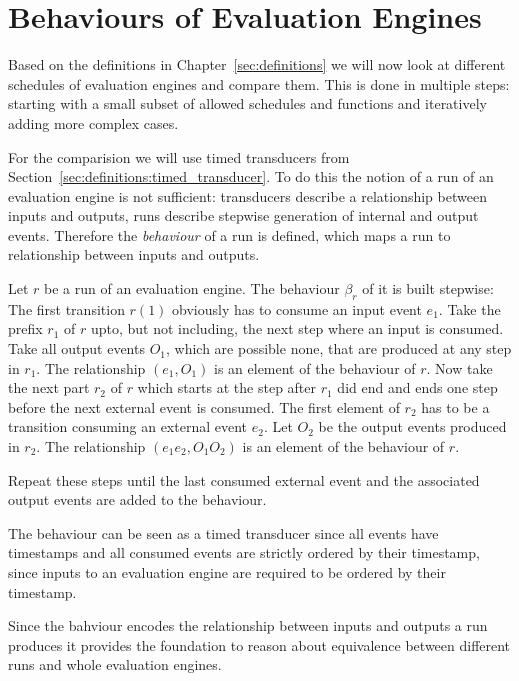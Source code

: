 \chapter{Behaviours of Evaluation Engines}
\label{sec:behaviours}

Based on the definitions in Chapter~\ref{sec:definitions} we will now look at different schedules of evaluation engines and compare them.
This is done in multiple steps: starting with a small subset of allowed schedules and functions and iteratively adding more complex cases.

For the comparision we will use timed transducers from Section~\ref{sec:definitions:timed_transducer}.
To do this the notion of a run of an evaluation engine is not sufficient: transducers describe a relationship between inputs and outputs, runs describe stepwise generation of internal and output events.
Therefore the \emph{behaviour} of a run is defined, which maps a run to relationship between inputs and outputs.

\begin{definition}[name = Behaviour of a Run]\label{def:behaviour_run}
  Let \(r\) be a run of an evaluation engine.
  The behaviour \(\beta_r\) of it is built stepwise:
  The first transition \(r(1)\) obviously has to consume an input event \(e_1\).
  Take the prefix \(r_1\) of \(r\) upto, but not including, the next step where an input is consumed.
  Take all output events \(O_1\), which are possible none, that are produced at any step in \(r_1\).
  The relationship \((e_1,O_1)\) is an element of the behaviour of \(r\).
  Now take the next part \(r_2\) of \(r\) which starts at the step after \(r_1\) did end and ends one step before the next external event is consumed.
  The first element of \(r_2\) has to be a transition consuming an external event \(e_2\).
  Let \(O_2\) be the output events produced in \(r_2\).
  The relationship \((e_1e_2, O_1O_2)\) is an element of the behaviour of \(r\).

  Repeat these steps until the last consumed external event and the associated output events are added to the behaviour.
\end{definition}

The behaviour can be seen as a timed transducer since all events have timestamps and all consumed events are strictly ordered by their timestamp, since inputs to an evaluation engine are required to be ordered by their timestamp.

Since the bahviour encodes the relationship between inputs and outputs a run produces it provides the foundation to reason about equivalence between different runs and whole evaluation engines.

